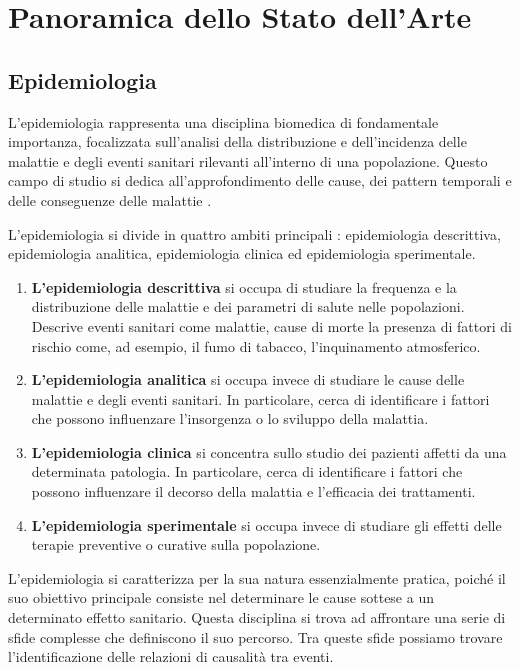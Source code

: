 \section{Panoramica dello Stato dell'Arte}

\subsection{Epidemiologia}
L'epidemiologia rappresenta una disciplina biomedica di fondamentale 
importanza, focalizzata sull'analisi della distribuzione e dell'incidenza 
delle malattie e degli eventi sanitari rilevanti all'interno di una 
popolazione. Questo campo di studio si dedica all'approfondimento 
delle cause, dei pattern temporali e delle conseguenze delle malattie 
\cite{Galea2009-lj} \cite{Parascandola2001-kw}.

L’epidemiologia si divide in quattro ambiti principali \cite{rothman2015modern}: epidemiologia
descrittiva, epidemiologia analitica, epidemiologia clinica ed epidemiologia
sperimentale.

\begin{enumerate}
    \item \textbf{L’epidemiologia descrittiva} si occupa di studiare la
    frequenza e la distribuzione delle malattie e dei parametri di salute
    nelle popolazioni. Descrive eventi sanitari come malattie, cause di morte 
    la presenza di fattori di rischio come, ad esempio, il fumo di tabacco,
    l’inquinamento atmosferico.
    \item \textbf{L’epidemiologia analitica} si occupa invece di studiare le
    cause delle malattie e degli eventi sanitari. In particolare, cerca di 
    identificare i fattori che possono influenzare l’insorgenza o lo sviluppo
    della malattia.
    \item \textbf{L’epidemiologia clinica} si concentra sullo studio dei
    pazienti affetti da una determinata patologia. In particolare, cerca di
    identificare i fattori che possono influenzare il decorso della malattia
    e l’efficacia dei trattamenti.
    \item \textbf{L’epidemiologia sperimentale} si occupa invece di studiare 
    gli effetti delle terapie preventive o curative sulla popolazione.
\end{enumerate}

L'epidemiologia si caratterizza per la sua natura essenzialmente 
pratica, poiché il suo obiettivo principale consiste nel determinare 
le cause sottese a un determinato effetto sanitario. Questa disciplina 
si trova ad affrontare una serie di sfide complesse che definiscono 
il suo percorso. Tra queste sfide possiamo trovare l'identificazione 
delle relazioni di causalità tra eventi.

